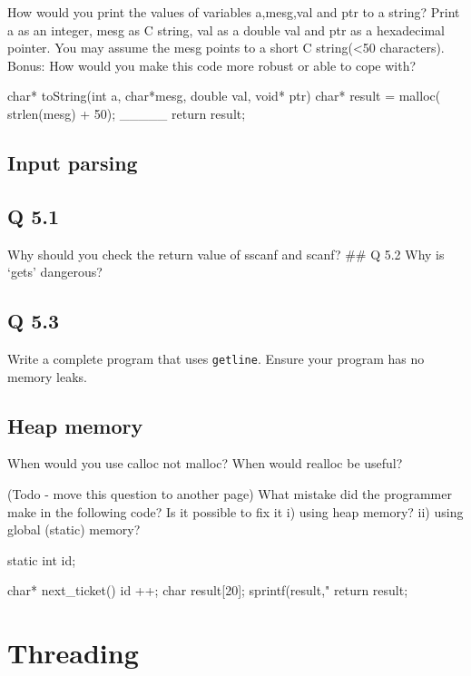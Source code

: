 How would you print the values of variables a,mesg,val and ptr to a string? Print a as an integer, mesg as C string, val as a double val and ptr as a hexadecimal pointer. You may assume the mesg points to a short C string(\textless{}50 characters). Bonus: How would you make this code more robust or able to cope with?

\begin{code}[language=C]
char* toString(int a, char*mesg, double val, void* ptr) {
   char* result = malloc( strlen(mesg) + 50);
    _____
   return result;
}
\end{code}

\subsection{Input parsing}\label{input-parsing}

\subsection{Q 5.1}\label{q-5.1}

Why should you check the return value of sscanf and scanf? \#\# Q 5.2 Why is `gets' dangerous?

\subsection{Q 5.3}\label{q-5.3}

Write a complete program that uses \texttt{getline}. Ensure your program has no memory leaks.

\subsection{Heap memory}\label{heap-memory}

When would you use calloc not malloc? When would realloc be useful?

(Todo - move this question to another page) What mistake did the programmer make in the following code? Is it possible to fix it i) using heap memory? ii) using global (static) memory?

\begin{code}[language=C]
static int id;

char* next_ticket() {
  id ++;
  char result[20];
  sprintf(result,"%
  return result;
}
\end{code}

\section{Threading}

